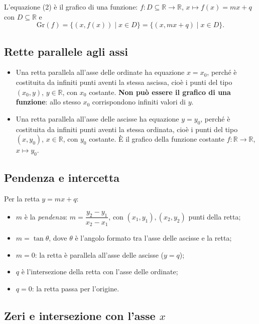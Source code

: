 \documentclass[11pt,a4paper]{article}
\begin{document}
L'equazione (2) è il grafico di una funzione: $f : D \subseteq \mathbb{R} \to \mathbb{R}$, $x \mapsto f(x) = mx + q$ con $D \subseteq \mathbb{R}$ e
\[
\mathrm{Gr}(f) = \{(x, f(x)) \mid x \in D\} = \{(x, mx + q) \mid x \in D\}.
\]

\subsection{Rette parallele agli assi}

\begin{itemize}
    \item Una retta parallela all'asse delle ordinate ha equazione $x = x_0$, perché è costituita da infiniti punti aventi la stessa ascissa, cioè i punti del tipo $(x_0, y)$, $y \in \mathbb{R}$, con $x_0$ costante. \textbf{Non può essere il grafico di una funzione}: allo stesso $x_0$ corrispondono infiniti valori di $y$.
    \item Una retta parallela all'asse delle ascisse ha equazione $y = y_0$, perché è costituita da infiniti punti aventi la stessa ordinata, cioè i punti del tipo $(x, y_0)$, $x \in \mathbb{R}$, con $y_0$ costante. È il grafico della funzione costante $f : \mathbb{R} \to \mathbb{R}$, $x \mapsto y_0$.
\end{itemize}

\subsection{Pendenza e intercetta}

Per la retta $y = mx + q$:
\begin{itemize}
    \item $m$ è la \emph{pendenza}: $m = \dfrac{y_2 - y_1}{x_2 - x_1}$, con $(x_1, y_1), (x_2, y_2)$ punti della retta;
    \item $m = \tan\theta$, dove $\theta$ è l'angolo formato tra l'asse delle ascisse e la retta;
    \item $m = 0$: la retta è parallela all'asse delle ascisse ($y = q$);
    \item $q$ è l'intersezione della retta con l'asse delle ordinate;
    \item $q = 0$: la retta passa per l'origine.
\end{itemize}

\subsection{Zeri e intersezione con l'asse $x$}
\end{document}
